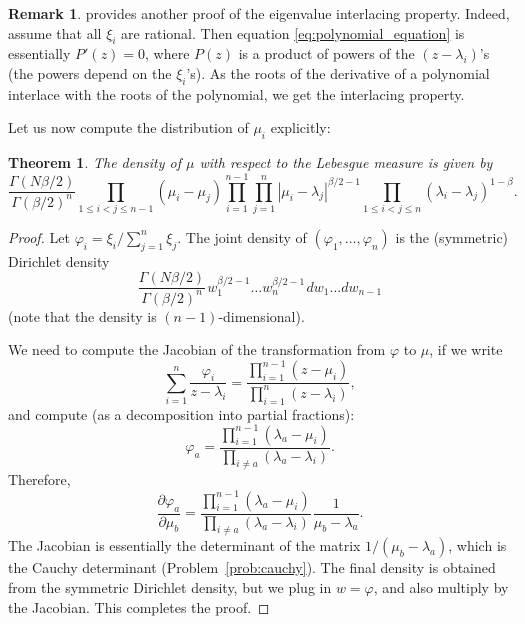 \documentclass[letterpaper,11pt,oneside,reqno]{article}
\numberwithin{equation}{section}
\newcommand{\ssp}{\hspace{1pt}}
\newtheorem{theorem}[proposition]{Theorem}
\theoremstyle{definition}
\newtheorem{remark}[proposition]{Remark}
\begin{document}
\begin{remark}
	provides another proof of the eigenvalue interlacing property.
	Indeed, assume that all $\xi_i$ are rational. Then
	equation
	\eqref{eq:polynomial_equation} is essentially $P'(z)=0$,
	where $P(z)$ is a product of powers of the $(z-\lambda_i)$'s
	(the powers depend on the $\xi_i$'s).
	As the roots of the derivative of a polynomial interlace with the roots of the polynomial,
	we get the interlacing property.
\end{remark}

Let us now compute the distribution of $\mu_i$ explicitly:
\begin{theorem}
	\label{thm:corner_step}
	The density of $\mu$ with respect to the Lebesgue measure is given by
	\begin{equation*}
		\frac{\Gamma(N \beta/2)}{\Gamma(\beta/2)^n}
		\prod_{1\le i<j\le n-1}(\mu_i-\mu_j)
		\prod_{i=1}^{n-1}\prod_{j=1}^n |\mu_i-\lambda_j|^{\beta/2-1}
		\prod_{1\le i<j\le n}(\lambda_i-\lambda_j)^{1-\beta}.
	\end{equation*}
\end{theorem}
\begin{proof}
	Let $\varphi_i=\xi_i/\sum_{j=1}^n \xi_j$. The joint
	density of $(\varphi_1,\ldots,\varphi_n )$ is the
	(symmetric) Dirichlet density
	\begin{equation*}
		\frac{\Gamma(N \beta/2)}{\Gamma(\beta/2)^n}
		\ssp
		w_1^{\beta/2-1}\ldots  w_n^{\beta/2-1}
		\ssp
		dw_1\ldots dw_{n-1}
	\end{equation*}
	(note that the density is $(n-1)$-dimensional).

	We need to compute the Jacobian of the transformation from $\varphi$ to $\mu$,
	if we write
	\begin{equation*}
		\sum_{i=1}^n\frac{\varphi_i}{z-\lambda_i}=
		\frac{\prod_{i=1}^{n-1}(z-\mu_i)}
		{\prod_{i=1}^n(z-\lambda_i)},
	\end{equation*}
	and compute
	(as a decomposition into partial fractions):
	\begin{equation*}
		\varphi_a=
		\frac{\prod_{i=1}^{n-1}(\lambda_a-\mu_i)}{\prod_{i\ne a}(\lambda_a-\lambda_i)}.
	\end{equation*}
	Therefore,
	\begin{equation*}
		\frac{\partial\varphi_a}{\partial\mu_b}=
		\frac{\prod_{i=1}^{n-1}(\lambda_a-\mu_i)}{\prod_{i\ne a}(\lambda_a-\lambda_i)}
		\ssp\frac{1}{\mu_b-\lambda_a}.
	\end{equation*}
	The Jacobian is essentially the determinant of the matrix $1/(\mu_b-\lambda_a)$,
	which is the Cauchy determinant
	(Problem~\ref{prob:cauchy}).
	The final density is obtained from the symmetric Dirichlet density,
	but we plug in $w=\varphi$, and also multiply by the Jacobian.
	This completes the proof.
\end{proof}
\end{document}
